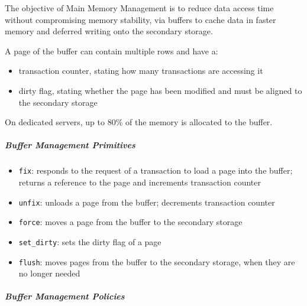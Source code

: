 \documentclass[english]{article}
\begin{document}
The objective of Main Memory Management is to reduce data access time without compromising memory stability, via buffers to cache data in faster memory and deferred writing onto the secondary storage.

A page of the buffer can contain multiple rows and have a:

\begin{itemize}
  \item transaction counter, stating how many transactions are accessing it
  \item dirty flag, stating whether the page has been modified and must be aligned to the secondary storage
\end{itemize}

On dedicated \dbms servers, up to \(80\%\) of the memory is allocated to the buffer.

\subparagraph*{Buffer Management Primitives}

\begin{itemize}[label=\texttt{>}]
  \item \texttt{fix}: responds to the request of a transaction to load a page into the buffer; returns a reference to the page and increments transaction counter
  \item \texttt{unfix}: unloads a page from the buffer; decrements transaction counter
  \item \texttt{force}: moves a page from the buffer to the secondary storage
  \item \texttt{set\_dirty}: sets the dirty flag of a page
  \item \texttt{flush}: moves pages from the buffer to the secondary storage, when they are no longer needed
\end{itemize}

\subparagraph*{Buffer Management Policies}
\end{document}
